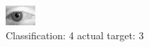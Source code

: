 \begin{figure}[h!]
\begin{center}
\includegraphics[width=0.60\columnwidth]{figures/ID2847_class_4_target_3.png}
\end{center}
\caption{ Classification: 4 actual target: 3}
\label{fig:ID2847_class_4_target_3}
\end{figure}
